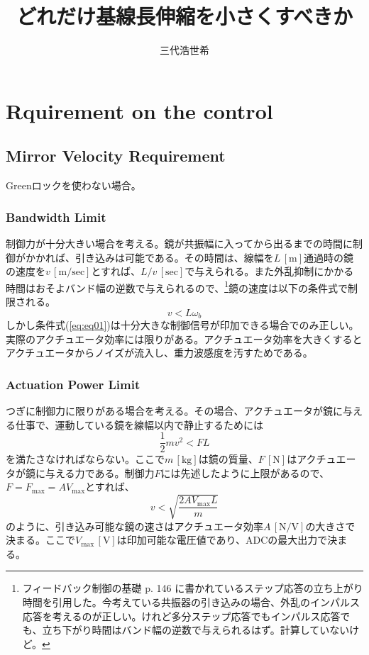 \documentclass[a4paper,12pt]{jsarticle}
\title{どれだけ基線長伸縮を小さくすべきか}
\author{三代浩世希}
\begin{document}
\setcounter{tocdepth}{2}
\maketitle
\abstract{
}
\section{Rquirement on the control}
\subsection{Mirror Velocity Requirement}
Greenロックを使わない場合。
\subsubsection{Bandwidth Limit}
制御力が十分大きい場合を考える。鏡が共振幅に入ってから出るまでの時間に制御がかかれば、引き込みは可能である。その時間は、線幅を$L\,\mathrm{[m]}$通過時の鏡の速度を$v\, \mathrm{[m/sec]}$とすれば、$L/v\, \mathrm{[sec]}$で与えられる。また外乱抑制にかかる時間はおそよバンド幅の逆数で与えられるので、\footnote[1]{フィードバック制御の基礎 p. 146 に書かれているステップ応答の立ち上がり時間を引用した。今考えている共振器の引き込みの場合、外乱のインパルス応答を考えるのが正しい。けれど多分ステップ応答でもインパルス応答でも、立ち下がり時間はバンド幅の逆数で与えられるはず。計算していないけど。}鏡の速度は以下の条件式で制限される。
\begin{equation} \label{eq:eq01}
v < L \omega_{b}
\end{equation}
しかし条件式(\ref{eq:eq01})は十分大きな制御信号が印加できる場合でのみ正しい。実際のアクチュエータ効率には限りがある。アクチュエータ効率を大きくするとアクチュエータからノイズが流入し、重力波感度を汚すためである。
\subsubsection{Actuation Power Limit}
つぎに制御力に限りがある場合を考える。その場合、アクチュエータが鏡に与える仕事で、運動している鏡を線幅以内で静止するためには
\begin{equation} \label{eq:eq02}
\frac{1}{2}mv^2 < F L
\end{equation}
を満たさなければならない。ここで$m\,\mathrm{[kg]}$は鏡の質量、$F\,\mathrm{[N]}$はアクチュエータが鏡に与える力である。制御力$F$には先述したように上限があるので、$F=F_{\mathrm{max}}=AV_{\mathrm{max}}$とすれば、
\begin{equation} \label{eq:eq03}
v < \sqrt{\frac{2AV_{\mathrm{max}}L}{m}}
\end{equation}
のように、引き込み可能な鏡の速さはアクチュエータ効率$A\,\mathrm{[N/V]}$の大きさで決まる。ここで$V_{\mathrm{max}}\,\mathrm{[V]}$は印加可能な電圧値であり、ADCの最大出力で決まる。
\end{document}
